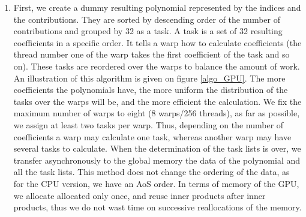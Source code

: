 \documentclass[oribibl]{llncs2e/llncs}
\begin{document}
\begin{enumerate}

\item  First, we create a dummy resulting polynomial  represented by the indices and the contributions. They are sorted by descending order of the number of contributions
and grouped by 32 as a task.   A task is a set of 32 resulting coefficients in a specific order. It tells a  warp how to calculate coefficients (the thread number one of the warp takes the first coefficient of the task and so on).
These tasks are reordered over the warps to balance the amount of work. An illustration of this algorithm is given on  figure \ref{algo_GPU}. 
The more coefficients the polynomials have, the more uniform the distribution of the tasks over the warps will be, and the more efficient the calculation.
We fix the maximum number of warps to eight (8 warps/256 threads), as far as possible, we assign at least two tasks per warp.
Thus, depending on  the number of coefficients a warp may calculate one task, whereas another warp may have several tasks to calculate.
When the determination of the task lists is over,  we transfer  asynchronously  to the global memory the data of the polynomial and all the task lists.
This method does not  change the ordering of the data, as for the CPU version, we have an AoS order.
In terms of memory of the GPU, we allocate allocated only once, and reuse inner products after inner products, thus we do not wast time on successive reallocations of the memory.


\end{enumerate}
\end{document}
